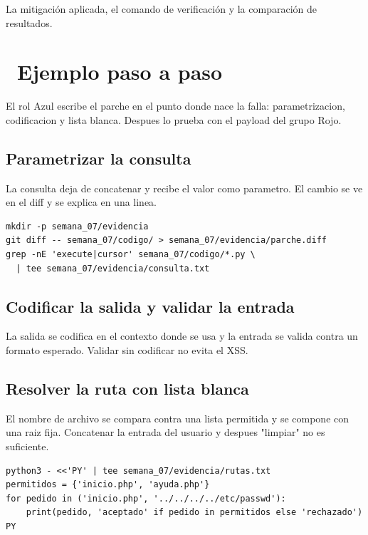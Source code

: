 \documentclass[11pt,a4paper]{article}
\newcommand{\iconotexto}[2]{\textcolor{cyanNeon}{\faIcon{#1}}~#2}
\begin{document}
La mitigación aplicada, el comando de verificación y la comparación de resultados.

\section{\iconotexto{list-ol}{Ejemplo paso a paso}}

El rol Azul escribe el parche en el punto donde nace la falla: parametrizacion, codificacion y lista blanca. Despues lo prueba con el payload del grupo Rojo.

\subsection{Parametrizar la consulta}

La consulta deja de concatenar y recibe el valor como parametro. El cambio se ve en el diff y se explica en una linea.

\begin{lstlisting}[style=estiloCodigo]
mkdir -p semana_07/evidencia
git diff -- semana_07/codigo/ > semana_07/evidencia/parche.diff
grep -nE 'execute|cursor' semana_07/codigo/*.py \
  | tee semana_07/evidencia/consulta.txt
\end{lstlisting}

\subsection{Codificar la salida y validar la entrada}

La salida se codifica en el contexto donde se usa y la entrada se valida contra un formato esperado. Validar sin codificar no evita el XSS.

\subsection{Resolver la ruta con lista blanca}

El nombre de archivo se compara contra una lista permitida y se compone con una raiz fija. Concatenar la entrada del usuario y despues "limpiar" no es suficiente.

\begin{lstlisting}[style=estiloCodigo]
python3 - <<'PY' | tee semana_07/evidencia/rutas.txt
permitidos = {'inicio.php', 'ayuda.php'}
for pedido in ('inicio.php', '../../../../etc/passwd'):
    print(pedido, 'aceptado' if pedido in permitidos else 'rechazado')
PY
\end{lstlisting}
\end{document}
